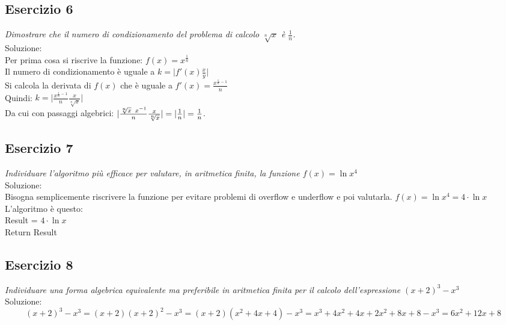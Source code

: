 \subsection{Esercizio 6}
\emph{Dimostrare che il numero di condizionamento del problema di calcolo $ \sqrt[n]{x} $ è $\frac{1}{n}$.\\}
Soluzione: \\
Per prima cosa si riscrive la funzione: $f(x) = x^{\frac{1}{n}}$\\
Il numero di condizionamento è uguale a $k = \lvert f'(x) \frac{x}{y} \rvert $\\ %
Si calcola la derivata di $ f(x) $ che è uguale a $ f'(x) = \frac{x^ { \frac{1}{n}-1 } }{n}$\\
Quindi: $ k = \lvert \frac{x^{\frac{1}{n}-1}}{n} \frac{x}{\sqrt[n]{x} }\rvert$ \\
Da cui con passaggi algebrici:
$\lvert \frac{\sqrt[n]{x} \hspace{1ex} x^{-1}}{n} \frac{x}{\sqrt[n]{x} } \rvert = \lvert \frac{1}{n} \rvert = \frac{1}{n} $.

\subsection{Esercizio 7}
\emph{Individuare l'algoritmo più efficace per valutare, in aritmetica finita, la funzione $f(x)=\ln{x^{4}}$\\}
Soluzione: \\
Bisogna semplicemente riscrivere la funzione per evitare problemi di overflow e underflow e poi valutarla.
$f(x) = \ln{x^{4}} = 4 \cdot \ln{x}$ \\
L'algoritmo è questo: \\
Result = $4 \cdot \ln{x}$ \\
Return Result\\

\subsection{Esercizio 8}
\emph{Individuare una forma algebrica equivalente ma preferibile in aritmetica finita per il calcolo dell'espressione $ (x+2)^{3} - x^{3}$\\}
Soluzione:\\
$$(x+2)^{3}-x^{3} = (x+2)(x+2)^{2} - x^{3} = (x+2)(x^{2}+4x+4)-x^{3} = x^{3} +4x^{2}+4x+2x^{2}+8x+8-x^{3} = 6x^{2} +12x+8 $$

